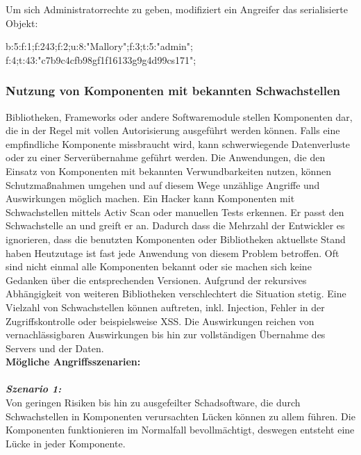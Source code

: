 Um sich Administratorrechte zu geben, modifiziert ein Angreifer das serialisierte Objekt:\\

\begin{LaTeXCode}[caption={Unsichere Deserialisierung - Beispiel 3},captionpos=b, label=LaTeXCode:ud3][numbers=none]
b:5:{f:1;f:243;f:2;u:8:"Mallory";f:3;t:5:"admin";
f:4;t:43:"c7b9c4cfb98gf1f16133g9g4d99cs171";}
\end{LaTeXCode}

\subsubsection{Nutzung von Komponenten mit bekannten Schwachstellen}

Bibliotheken, Frameworks oder andere Softwaremodule stellen Komponenten dar, die in der Regel mit vollen Autorisierung ausgeführt werden können. Falls eine empfindliche Komponente missbraucht wird, kann schwerwiegende Datenverluste oder zu einer Serverübernahme geführt werden. Die Anwendungen, die den Einsatz von Komponenten mit bekannten Verwundbarkeiten nutzen, können Schutzmaßnahmen umgehen und auf diesem Wege unzählige Angriffe und Auswirkungen möglich machen. Ein Hacker kann Komponenten mit Schwachstellen mittels Activ Scan oder manuellen Tests erkennen. Er passt den Schwachstelle an und greift er an. Dadurch dass die Mehrzahl der Entwickler es ignorieren, dass die benutzten Komponenten oder Bibliotheken aktuellste Stand haben Heutzutage ist fast jede Anwendung von diesem Problem betroffen. Oft sind nicht einmal alle Komponenten bekannt oder sie machen sich keine Gedanken über die entsprechenden Versionen. Aufgrund der rekursives Abhängigkeit von weiteren Bibliotheken verschlechtert die Situation stetig. Eine Vielzahl von Schwachstellen können auftreten, inkl. Injection, Fehler in der Zugriffskontrolle oder beispielsweise XSS. Die Auswirkungen reichen von vernachlässigbaren Auswirkungen bis hin zur vollständigen Übernahme des Servers und der Daten\cite{owasp13top10}.\\

\textbf{Mögliche Angriffsszenarien:}\\
\\
\textbf{\textit{Szenario 1:}}\\

Von geringen Risiken bis hin zu ausgefeilter Schadsoftware, die durch Schwachstellen in Komponenten verursachten Lücken können zu allem führen. Die Komponenten funktionieren im Normalfall bevollmächtigt, deswegen entsteht eine Lücke in jeder Komponente\cite{owasp13top10}.


